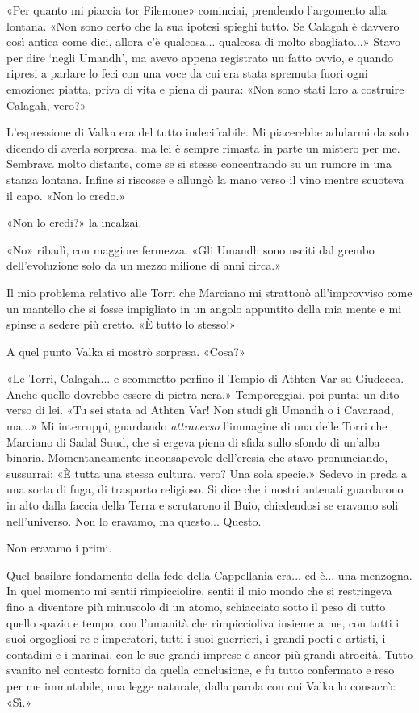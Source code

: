 «Per quanto mi piaccia tor Filemone» cominciai, prendendo l'argomento
alla lontana. «Non sono certo che la sua ipotesi spieghi tutto. Se
Calagah è davvero così antica come dici, allora c'è qualcosa... qualcosa
di molto sbagliato...» Stavo per dire `negli Umandh', ma avevo appena
registrato un fatto ovvio, e quando ripresi a parlare lo feci con una
voce da cui era stata spremuta fuori ogni emozione: piatta, priva di
vita e piena di paura: «Non sono stati loro a costruire Calagah, vero?»

L'espressione di Valka era del tutto indecifrabile. Mi piacerebbe
adularmi da solo dicendo di averla sorpresa, ma lei è sempre rimasta in
parte un mistero per me. Sembrava molto distante, come se si stesse
concentrando su un rumore in una stanza lontana. Infine si riscosse e
allungò la mano verso il vino mentre scuoteva il capo. «Non lo credo.»

«Non lo credi?» la incalzai.

«No» ribadì, con maggiore fermezza. «Gli Umandh sono usciti dal grembo
dell'evoluzione solo da un mezzo milione di anni circa.»

Il mio problema relativo alle Torri che Marciano mi strattonò
all'improvviso come un mantello che si fosse impigliato in un angolo
appuntito della mia mente e mi spinse a sedere più eretto. «È tutto lo
stesso!»

A quel punto Valka si mostrò sorpresa. «Cosa?»

«Le Torri, Calagah... e scommetto perfino il Tempio di Athten Var su
Giudecca. Anche quello dovrebbe essere di pietra nera.» Temporeggiai,
poi puntai un dito verso di lei. «Tu sei stata ad Athten Var! Non studi
gli Umandh o i Cavaraad, ma...» Mi interruppi, guardando
\emph{attraverso} l'immagine di una delle Torri che Marciano di Sadal
Suud, che si ergeva piena di sfida sullo sfondo di un'alba binaria.
Momentaneamente inconsapevole dell'eresia che stavo pronunciando,
sussurrai: «È tutta una stessa cultura, vero? Una sola specie.» Sedevo
in preda a una sorta di fuga, di trasporto religioso. Si dice che i
nostri antenati guardarono in alto dalla faccia della Terra e scrutarono
il Buio, chiedendosi se eravamo soli nell'universo. Non lo eravamo, ma
questo... Questo.

Non eravamo i primi.

Quel basilare fondamento della fede della Cappellania era... ed è... una
menzogna. In quel momento mi sentii rimpicciolire, sentii il mio mondo
che si restringeva fino a diventare più minuscolo di un atomo,
schiacciato sotto il peso di tutto quello spazio e tempo, con l'umanità
che rimpiccioliva insieme a me, con tutti i suoi orgogliosi re e
imperatori, tutti i suoi guerrieri, i grandi poeti e artisti, i
contadini e i marinai, con le sue grandi imprese e ancor più grandi
atrocità. Tutto svanito nel contesto fornito da quella conclusione, e fu
tutto confermato e reso per me immutabile, una legge naturale, dalla
parola con cui Valka lo consacrò: «Sì.»

